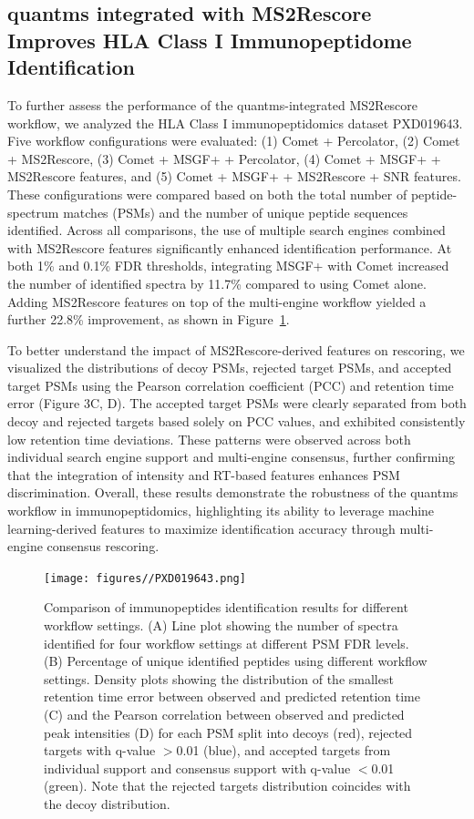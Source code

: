 \documentclass[12pt]{article}
\begin{document}
\subsection{quantms integrated with MS2Rescore Improves HLA Class I Immunopeptidome Identification}
To further assess the performance of the quantms-integrated MS2Rescore workflow, we analyzed the HLA Class I immunopeptidomics dataset PXD019643. Five workflow configurations were evaluated: (1) Comet + Percolator, (2) Comet + MS2Rescore, (3) Comet + MSGF+ + Percolator, (4) Comet + MSGF+ + MS2Rescore features, and (5) Comet + MSGF+ + MS2Rescore + SNR features. These configurations were compared based on both the total number of peptide-spectrum matches (PSMs) and the number of unique peptide sequences identified. Across all comparisons, the use of multiple search engines combined with MS2Rescore features significantly enhanced identification performance. At both 1\% and 0.1\% FDR thresholds, integrating MSGF+ with Comet increased the number of identified spectra by 11.7\% compared to using Comet alone. Adding MS2Rescore features on top of the multi-engine workflow yielded a further 22.8\% improvement, as shown in Figure~\ref{fig:PXD019643_immunopeptides}.

To better understand the impact of MS2Rescore-derived features on rescoring, we visualized the distributions of decoy PSMs, rejected target PSMs, and accepted target PSMs using the Pearson correlation coefficient (PCC) and retention time error (Figure 3C, D). The accepted target PSMs were clearly separated from both decoy and rejected targets based solely on PCC values, and exhibited consistently low retention time deviations. These patterns were observed across both individual search engine support and multi-engine consensus, further confirming that the integration of intensity and RT-based features enhances PSM discrimination. Overall, these results demonstrate the robustness of the quantms workflow in immunopeptidomics, highlighting its ability to leverage machine learning-derived features to maximize identification accuracy through multi-engine consensus rescoring.

\begin{figure}[ht!]
	\centering
	\texttt{[image: figures//PXD019643.png]}
	\caption{Comparison of immunopeptides identification results for different workflow settings. (A) Line plot showing the number of spectra identified for four workflow settings at different PSM FDR levels. (B) Percentage of unique identified peptides using different workflow settings. Density plots showing the distribution of the smallest retention time error between observed and predicted retention time (C) and the Pearson correlation between observed and predicted peak intensities (D) for each PSM split into decoys (red), rejected targets with q-value $>$0.01 (blue), and accepted targets from individual support and consensus support with q-value $<$0.01 (green). Note that the rejected targets distribution coincides with the decoy distribution.}
	\label{fig:PXD019643_immunopeptides}
\end{figure}
\end{document}
